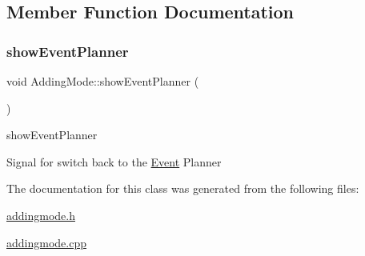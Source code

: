 \subsection{Member Function Documentation}
\mbox{\label{class_adding_mode_ac9a9d671ccfc803f9844cde060a12ca5}} 
\subsubsection{\texorpdfstring{show\+Event\+Planner}{showEventPlanner}}
{\footnotesize\ttfamily void Adding\+Mode\+::show\+Event\+Planner (\begin{DoxyParamCaption}{ }\end{DoxyParamCaption})\hspace{0.3cm}{\ttfamily [signal]}}



show\+Event\+Planner 

Signal for switch back to the \hyperlink{class_event}{Event} Planner 

The documentation for this class was generated from the following files\+:\begin{DoxyCompactItemize}
\item 
\hyperlink{addingmode_8h}{addingmode.\+h}\item 
\hyperlink{addingmode_8cpp}{addingmode.\+cpp}\end{DoxyCompactItemize}
